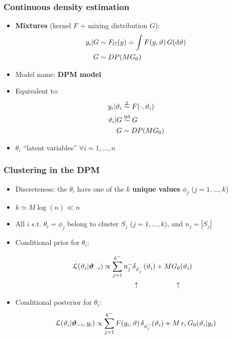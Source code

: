 \begin{frame}
	\frametitle{Continuous density estimation}
	\begin{itemize}
		\item \textbf{Mixtures} (kernel $F$ + mixing distribution $G$):
		\begin{align*}
			y_i | G &\sim F_G(y) = \int F(y,\vartheta) \, G(\mathrm d\vartheta) \\
			G &\sim DP(M G_0)
		\end{align*}
		\vspace{-10pt}
		\item Model name: \textbf{DPM model}
		\item Equivalent to:
		\begin{align*}
			y_i | \theta_i &\indsim F(\cdot,\theta_i) \\
			\theta_i | G &\iidsim G \\
			G &\sim DP(M G_0)
		\end{align*}
		\item $\theta_i$ ``latent variables'' $\forall i = 1,\dots,n$
	\end{itemize}
\end{frame}


\begin{frame}
	\frametitle{Clustering in the DPM}
	\begin{itemize}
		\item Discreteness: the $\theta_i$ have one of the $k$ \textbf{unique values} $\phi_j$ {\tiny ($j=1,\dots,k$)}
		\item $k \simeq M \log(n) \ll n$
		\item All $i$ s.t. $\theta_i = \phi_j$ belong to cluster $S_j $ {\tiny ($j=1,\dots,k$)}, and $n_j = |S_j|$
		\pause
		\item Conditional prior for $\theta_i$:
			\begin{minipage}{0.3\textwidth}
				\begin{align*}
					\hspace{-10pt}
					\Lc(\theta_i | \boldsymbol\theta_{-i}) \propto
					\sum_{j=1}^{k^-} n^-_j &\delta_{\phi^-_j} (\theta_i) + M G_0 (\theta_i) \\
					&\uparrow \hspace{55pt} \uparrow
				\end{align*}
			\end{minipage}%
			\begin{minipage}{0.5\textwidth}
				
			\end{minipage}
		\item Conditional posterior for $\theta_i$:
		$$ \mathcal L(\vartheta_i | \boldsymbol{\vartheta}_{-i}, y_i) \propto
		\sum_{j=1}^{k^-} F(y_i,\vartheta) \, \delta_{\phi^-_j} (\vartheta_i) + M \, r_i \, G_0(\vartheta_i | y_i) $$ %
	\end{itemize}
\end{frame}


